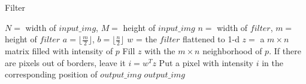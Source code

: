 \documentclass{article}
\begin{document}
\begin{algorithm}[H]
\centering
\caption{Filter}
  \begin{algorithmic}[1]
     \State $N = $ width of $input\_img$, $M = $ height of $input\_img$
     \State $n = $ width of $filter$, $m = $ height of $filter$
     \State $a = \lfloor{\frac{m}{2}}\rfloor$, $b = \lfloor{\frac{n}{2}}\rfloor$
     \State $w$ = the $filter$ flattened to 1-d
     	\State $z = $ a $m \times n$ matrix filled with intensity of $p$
     	\State Fill $z$ with the $m \times n$ neighborhood of $p$. If there are pixels out of borders, leave it
     	\State $i = w^{T}z$
     	\State Put a pixel with intensity $i$ in the corresponding position of $output\_img$
     \EndFor
     \State \Return $output\_img$ 
    \EndFunction
  \end{algorithmic}
\end{algorithm}


\end{document}
